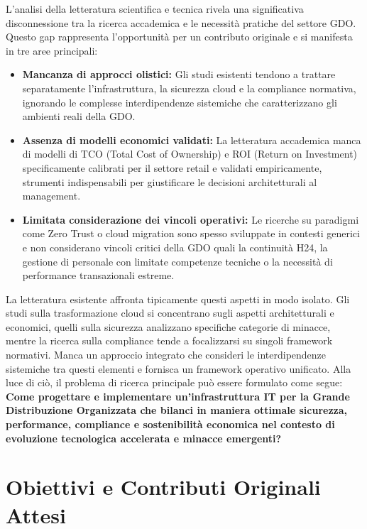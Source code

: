 L'analisi della letteratura scientifica e tecnica rivela una significativa disconnessione tra la ricerca accademica e le necessità pratiche del settore GDO. Questo gap rappresenta l'opportunità per un contributo originale e si manifesta in tre aree principali:
\begin{itemize}
\item \textbf{Mancanza di approcci olistici:} Gli studi esistenti tendono a trattare separatamente l'infrastruttura, la sicurezza cloud e la compliance normativa, ignorando le complesse interdipendenze sistemiche che caratterizzano gli ambienti reali della GDO.
\item \textbf{Assenza di modelli economici validati:} La letteratura accademica manca di modelli di TCO (Total Cost of Ownership) e ROI (Return on Investment) specificamente calibrati per il settore retail e validati empiricamente, strumenti indispensabili per giustificare le decisioni architetturali al management.
\item \textbf{Limitata considerazione dei vincoli operativi: }Le ricerche su paradigmi come Zero Trust o cloud migration sono spesso sviluppate in contesti generici e non considerano vincoli critici della GDO quali la continuità H24, la gestione di personale con limitate competenze tecniche o la necessità di performance transazionali estreme.

\end{itemize}
La letteratura esistente affronta tipicamente questi aspetti in modo isolato. Gli studi sulla trasformazione cloud si concentrano sugli aspetti architetturali e economici\autocite{forrester2024}, quelli sulla sicurezza analizzano specifiche categorie di minacce\autocite{ponemon2024}, mentre la ricerca sulla compliance tende a focalizzarsi su singoli framework normativi. Manca un approccio integrato che consideri le interdipendenze sistemiche tra questi elementi e fornisca un framework operativo unificato.
Alla luce di ciò, il problema di ricerca principale può essere formulato come segue:
\textbf{Come progettare e implementare un'infrastruttura IT per la Grande Distribuzione Organizzata che bilanci in maniera ottimale sicurezza, performance, compliance e sostenibilità economica nel contesto di evoluzione tecnologica accelerata e minacce emergenti? }

\section{Obiettivi e Contributi Originali Attesi}
